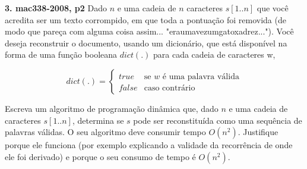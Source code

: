 
\noindent \textbf{3. mac338-2008, p2} Dado $n$ e uma cadeia de $n$ caracteres $s[1..n]$ que você acredita ser um texto corrompido, em que toda a pontuação foi removida (de modo que pareça com alguma coisa assim... "eraumavezumgatoxadrez..."). Você deseja reconstruir o documento, usando um dicionário, que está disponível na forma de uma função booleana $dict(.)$ para cada cadeia de caracteres w,

\begin{equation*}
    dict(.) =
    \begin{cases}
        true & \text{se $w$ é uma palavra válida} \\
        false & \text{caso contrário}
    \end{cases}
\end{equation*}

Escreva um algoritmo de programação dinâmica que, dado $n$ e uma cadeia de caracteres $s[1..n]$, determina se $s$ pode ser reconstituída como uma sequência de palavras válidas. O seu algoritmo deve consumir tempo $O(n^2)$. Justifique porque ele funciona (por exemplo explicando a validade da recorrência de onde ele foi derivado) e porque o seu consumo de tempo é $O(n^2)$.\\[12pt]